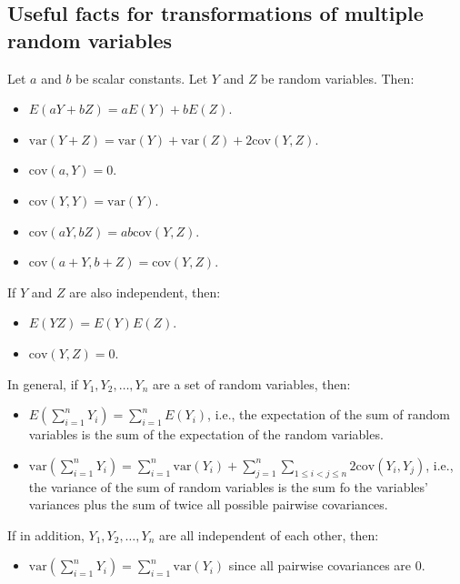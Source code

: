 \documentclass[
]{book}
\providecommand{\tightlist}{%
  \setlength{\itemsep}{0pt}\setlength{\parskip}{0pt}}
\theoremstyle{definition}
\theoremstyle{definition}
\theoremstyle{definition}
\theoremstyle{definition}
\theoremstyle{remark}
\begin{document}
\hypertarget{useful-facts-for-transformations-of-multiple-random-variables}{%
\subsection{Useful facts for transformations of multiple random variables}\label{useful-facts-for-transformations-of-multiple-random-variables}}

Let \(a\) and \(b\) be scalar constants. Let \(Y\) and \(Z\) be random variables. Then:

\begin{itemize}
\tightlist
\item
  \(E(aY+bZ)=aE(Y)+bE(Z)\).
\item
  \(\mathrm{var}(Y+Z)=\mathrm{var}(Y)+\mathrm{var}(Z)+2\mathrm{cov}(Y, Z)\).
\item
  \(\mathrm{cov}(a,Y)=0\).
\item
  \(\mathrm{cov}(Y,Y)=\mathrm{var}(Y)\).
\item
  \(\mathrm{cov}(aY, bZ)=ab\mathrm{cov}(Y, Z)\).
\item
  \(\mathrm{cov}(a + Y,b + Z)=\mathrm{cov}(Y, Z)\).
\end{itemize}

If \(Y\) and \(Z\) are also independent, then:

\begin{itemize}
\tightlist
\item
  \(E(YZ)=E(Y)E(Z)\).
\item
  \(\mathrm{cov}(Y, Z)=0\).
\end{itemize}

In general, if \(Y_1, Y_2, \ldots, Y_n\) are a set of random variables, then:

\begin{itemize}
\tightlist
\item
  \(E(\sum_{i=1}^n Y_i) = \sum_{i=1}^n E(Y_i)\), i.e., the expectation of the sum of random variables is the sum of the expectation of the random variables.
\item
  \(\mathrm{var}(\sum_{i=1}^n Y_i) = \sum_{i=1}^n \mathrm{var}(Y_i) + \sum_{j=1}^n\sum_{1\leq i<j\leq n}2\mathrm{cov}(Y_i, Y_j)\), i.e., the variance of the sum of random variables is the sum fo the variables' variances plus the sum of twice all possible pairwise covariances.
\end{itemize}

If in addition, \(Y_1, Y_2, \ldots, Y_n\) are all independent of each other, then:

\begin{itemize}
\tightlist
\item
  \(\mathrm{var}(\sum_{i=1}^n Y_i) = \sum_{i=1}^n \mathrm{var}(Y_i)\) since all pairwise covariances are 0.
\end{itemize}
\end{document}
